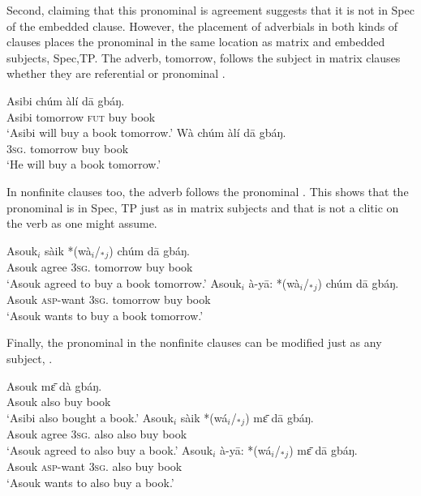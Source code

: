 \documentclass[output=paper,colorlinks,citecolor=brown]{langscibook}
\begin{document}
Second, claiming that this pronominal is agreement suggests that it is not in Spec of the embedded clause. However, the placement of adverbials in both kinds of clauses places the pronominal in the same location as matrix and embedded subjects, Spec,TP. The adverb, tomorrow, follows the subject in matrix clauses whether they are referential  or pronominal . 

\ea%
    \label{ex:sulemana:26}
    \ea%
    \label{ex:sulemana:26a}
    \gll    Asibi chúm àlí dā gbáŋ. \\
            Asibi tomorrow \textsc{fut} buy book\\
    \glt    `Asibi will buy a book tomorrow.' 
    \ex%
    \label{ex:sulemana:26b}
    \gll    Wà chúm àlí dā gbáŋ. \\
            \textsc{3sg}. tomorrow buy book\\
    \glt    `He will buy a book tomorrow.' 
    \z
\z

In nonfinite clauses too, the adverb follows the pronominal . This shows that the pronominal is in Spec, TP just as in matrix subjects and that is not a clitic on the verb as one might assume. 

\ea%
    \label{ex:sulemana:27}
    \ea%
    \label{ex:sulemana:27a}
    \gll    Asouk$_i$ sàik *(wà$_i$/$_*${}$_j$) chúm dā gbáŋ.\\
            Asouk agree \textsc{3sg}. tomorrow buy book\\
    \glt    `Asouk agreed to buy a book tomorrow.'
    \ex%
    \label{ex:sulemana:27b}
    \gll    Asouk$_i$ à-yā:  *(wà$_i$/$_*${}$_j$) chúm dā gbáŋ.\\
            Asouk  \textsc{asp}-want \textsc{3sg}. tomorrow buy book\\
    \glt    `Asouk wants to buy a book tomorrow.'  
    \z
\z

Finally, the pronominal in the nonfinite clauses can be modified just as any subject, .

\ea%
    \label{ex:sulemana:28}
    \ea%
    \label{ex:sulemana:28a}
    \gll    Asouk mɛ̄ dà gbáŋ.\\
            Asouk also buy book\\
    \glt    `Asibi also bought a book.' 
    \ex%
    \label{ex:sulemana:28b}
    \gll    Asouk$_i$ sàik *(wá$_i$/$_*${}$_j$) mɛ̄ dā gbáŋ.\\
            Asouk agree \textsc{3sg}. also also buy book\\
    \glt    `Asouk agreed to also buy a book.'
    \ex%
    \label{ex:sulemana:28c}
    \gll    Asouk$_i$ à-yā:  *(wá$_i$/$_*${}$_j$) mɛ̄ dā gbáŋ.\\
            Asouk \textsc{asp}-want \textsc{3sg}. also buy book\\
    \glt    `Asouk wants to also buy a book.'  
    \z
\z
\end{document}
